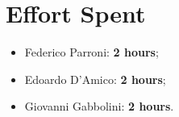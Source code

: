 \chapter{Effort Spent}
\begin{itemize}
\item Federico Parroni: \textbf{2 hours};
\item Edoardo D'Amico: \textbf{2 hours};
\item Giovanni Gabbolini: \textbf{2 hours}.
\end{itemize}
